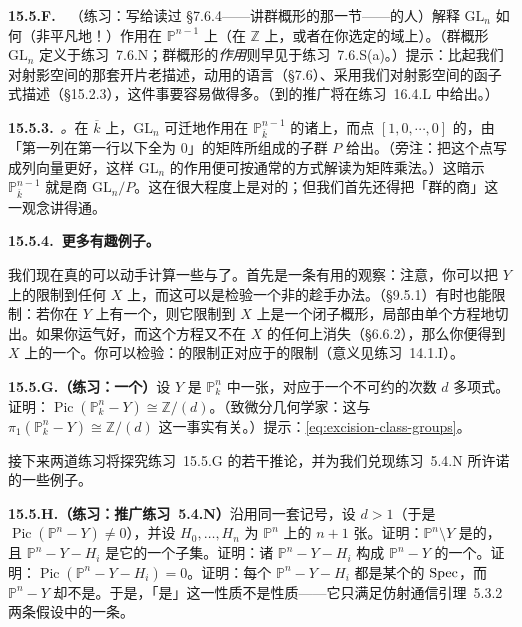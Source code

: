 \textbf{15.5.F.}\ \hard\ （练习：写给读过 \S7.6.4——讲群概形的那一\extrahard{}节——的人）\quad 解释 $\mathrm{GL}_n$ 如何（非平凡地！）作用在 $\mathbb{P}^{n-1}$ 上（在 $\mathbb{Z}$ 上，或者在你选定的域上）。（群概形 $\mathrm{GL}_n$ 定义于\mbox{练习~7.6.N}；群概形的\emph{作用}则早见于\mbox{练习~7.6.S}(a)。）提示：比起我们对射影空间的那套开片老描述，动用\trFunctor{}的语言（\S7.6）、采用我们对射影空间的函子式描述（\S15.2.3），这件事要容易做得多。（到\trGrassmannian{}的推广将在\mbox{练习~16.4.L} 中给出。）

\textbf{15.5.3.}\ \emph{\trhRemark{}。}\quad 在\trAlgClosedField{} $\overline{k}$ 上，$\mathrm{GL}_n$ 可迁地作用在 $\mathbb{P}^{n-1}_{\overline{k}}$ 的诸\trClosedPoint{}上，而点 $[1,0,\cdots,0]$ 的\trStabilizer，由「第一列在第一行以下全为 $0$」的矩阵所组成的子群 $P$ 给出。（旁注：把这个点写成列向量更好，这样 $\mathrm{GL}_n$ 的作用便可按通常的方式解读为矩阵乘法。）这暗示 $\mathbb{P}^{n-1}_{\overline{k}}$ 就是商 $\mathrm{GL}_n/P$。这在很大程度上是对的；但我们首先还得把「群的商」这一观念讲得通。

\textbf{15.5.4.\ 更多有趣例子。}

我们现在真的可以动手计算一些\trPicardGroup{}与\trClassGroup{}了。首先是一条有用的观察：注意，你可以把 $Y$ 上的\trInvertibleSheaf{}限制到任何\trSubscheme{} $X$ 上，而这可以是检验一个\trInvertibleSheaf{}非\trTrivial{}的趁手办法。\trEffectiveCartierDivisor（\S9.5.1）有时也能限制：若你在 $Y$ 上有一个\trEffectiveCartierDivisor，则它限制到 $X$ 上是一个闭子概形，局部由单个方程\trSchemeTheoretic{}地切出。如果你运气好，而这个方程又不在 $X$ 的任何\trAssociatedPoint{}上消失（\S6.6.2），那么你便得到 $X$ 上的一个\trEffectiveCartierDivisor。你可以检验：\trEffectiveCartierDivisor{}的限制正对应于\trInvertibleSheaf{}的限制（意义见\mbox{练习~14.1.I}）。

\textbf{15.5.G.（练习：一个\trTorsion\trPicardGroup）}\quad 设 $Y$ 是 $\mathbb{P}^n_k$ 中一张\trHypersurface，对应于一个不可约的次数 $d$ 多项式。证明：$\operatorname{Pic}(\mathbb{P}^n_k-Y)\cong\mathbb{Z}/(d)$。（致微分几何学家：这与 $\pi_1(\mathbb{P}^n_k-Y)\cong\mathbb{Z}/(d)$ 这一事实有关。）提示：\eqref{eq:excision-class-groups}。

接下来两道练习将探究\mbox{练习~15.5.G} 的若干推论，并为我们兑现\mbox{练习~5.4.N} 所许诺的一些例子。

\textbf{15.5.H.（练习：推广\mbox{练习~5.4.N}）}\quad 沿用同一套记号，设 $d>1$（于是 $\operatorname{Pic}(\mathbb{P}^n-Y)\ne 0$），并设 $H_0,\dots,H_n$ 为 $\mathbb{P}^n$ 上的 $n+1$ 张\trCoordinate{}\trHyperplane。证明：$\mathbb{P}^n\setminus Y$ 是\trAffine{}的，且 $\mathbb{P}^n-Y-H_i$ 是它的一个\trDistinguishedOpen{}子集。证明：诸 $\mathbb{P}^n-Y-H_i$ 构成 $\mathbb{P}^n-Y$ 的一个\trOpenCover。证明：$\operatorname{Pic}(\mathbb{P}^n-Y-H_i)=0$。证明：每个 $\mathbb{P}^n-Y-H_i$ 都是某个\trUFD{}的 $\operatorname{Spec}$，而 $\mathbb{P}^n-Y$ 却不是。于是，「是\trUFD」这一性质不是\trAffineLocal{}性质——它只满足\mbox{仿射通信引理~5.3.2} 两条假设中的一条。

